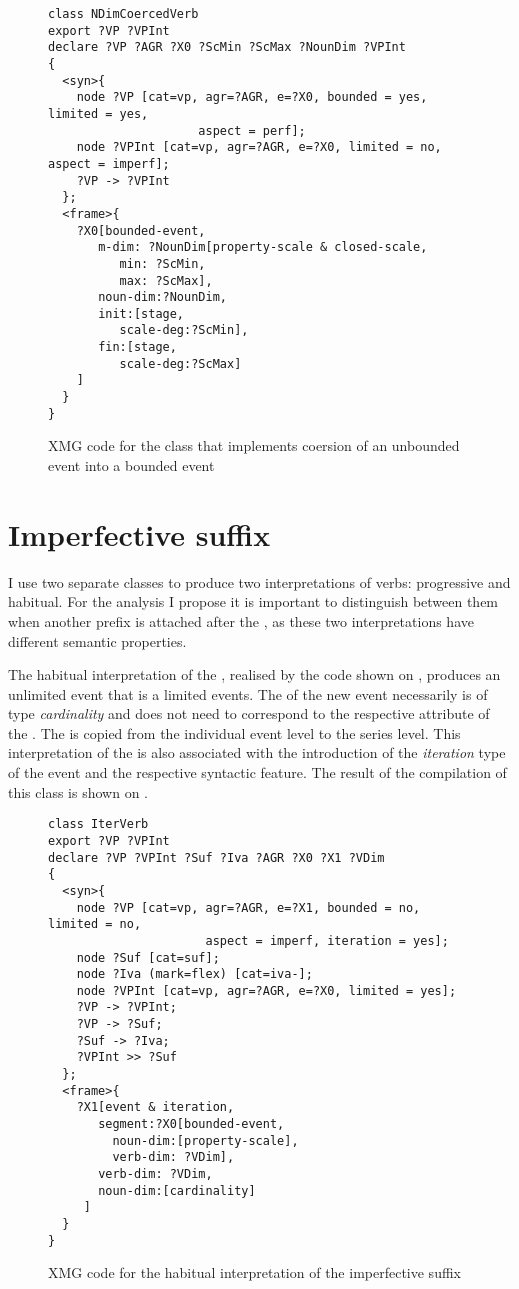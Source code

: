 \begin{figure}
\begin{lstlisting}[style=xmg]
class NDimCoercedVerb
export ?VP ?VPInt
declare ?VP ?AGR ?X0 ?ScMin ?ScMax ?NounDim ?VPInt
{
  <syn>{
    node ?VP [cat=vp, agr=?AGR, e=?X0, bounded = yes, limited = yes, 
    				 aspect = perf];
    node ?VPInt [cat=vp, agr=?AGR, e=?X0, limited = no, aspect = imperf];
    ?VP -> ?VPInt
  };
  <frame>{
    ?X0[bounded-event,
       m-dim: ?NounDim[property-scale & closed-scale,
          min: ?ScMin,
          max: ?ScMax],
       noun-dim:?NounDim,
       init:[stage, 
          scale-deg:?ScMin],
       fin:[stage, 
          scale-deg:?ScMax]
    ]
  }
}
\end{lstlisting}
\caption{XMG code for the class that implements coersion of an unbounded event into a bounded event\label{xmg:coersion}}
\end{figure}

\section{Imperfective suffix}
I use two separate classes to produce two interpretations of  verbs: progressive and habitual. For the analysis I propose it is important to distinguish between them when another prefix is attached after the , as these two interpretations have different semantic properties.

The habitual interpretation of the , realised by the code shown on , produces an unlimited event that is a  limited events. The \NOUNDIM of the new event necessarily is of type \textit{cardinality} and does not need to correspond to the respective attribute of the . The  is copied from the individual event level to the series level. This interpretation of the  is also associated with the introduction of the \textit{iteration} type of the event and the respective syntactic feature. The result of the compilation of this class is shown on .

\begin{figure}
\begin{lstlisting}[style=xmg]
class IterVerb
export ?VP ?VPInt
declare ?VP ?VPInt ?Suf ?Iva ?AGR ?X0 ?X1 ?VDim
{
  <syn>{
    node ?VP [cat=vp, agr=?AGR, e=?X1, bounded = no, limited = no, 
    				  aspect = imperf, iteration = yes];
    node ?Suf [cat=suf];
    node ?Iva (mark=flex) [cat=iva-];
    node ?VPInt [cat=vp, agr=?AGR, e=?X0, limited = yes];
    ?VP -> ?VPInt;
    ?VP -> ?Suf;
    ?Suf -> ?Iva;
    ?VPInt >> ?Suf
  };
  <frame>{
    ?X1[event & iteration,
       segment:?X0[bounded-event,
         noun-dim:[property-scale],
         verb-dim: ?VDim],
       verb-dim: ?VDim,
       noun-dim:[cardinality] 
     ]
  }
}
\end{lstlisting}
\caption{XMG code for the habitual interpretation of the imperfective suffix \label{xmg:habitual}}
\end{figure}

